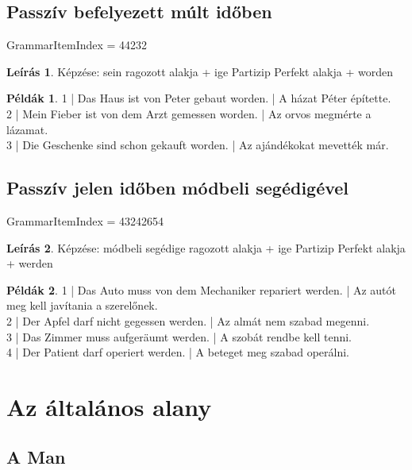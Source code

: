 \documentclass{article}
\theoremstyle{definition}
\newtheorem*{exmp}{Példák}
\newtheorem*{desc}{Leírás}
\begin{document}
\subsection{Passzív befelyezett múlt időben}

GrammarItemIndex = 44232

\begin{desc}
Képzése: sein ragozott alakja + ige Partizip Perfekt alakja + worden
\end{desc}

\begin{exmp}
1 | Das Haus ist von Peter gebaut worden. | A házat Péter építette.\\
2 | Mein Fieber ist von dem Arzt gemessen worden. | Az orvos megmérte a lázamat.\\
3 | Die Geschenke sind schon gekauft worden. | Az ajándékokat mevették már.\\
\end{exmp}

\subsection{Passzív jelen időben módbeli segédigével}

GrammarItemIndex = 43242654

\begin{desc}
Képzése: módbeli segédige ragozott alakja + ige Partizip Perfekt alakja + werden
\end{desc}

\begin{exmp}
1 | Das Auto muss von dem Mechaniker repariert werden. | Az autót meg kell javítania a szerelőnek.\\
2 | Der Apfel darf nicht gegessen werden. | Az almát nem szabad megenni.\\
3 | Das Zimmer muss aufgeräumt werden. | A szobát rendbe kell tenni.\\
4 | Der Patient darf operiert werden. | A beteget meg szabad operálni.\\
\end{exmp}

\section{Az általános alany}

\subsection{A Man}
\end{document}
